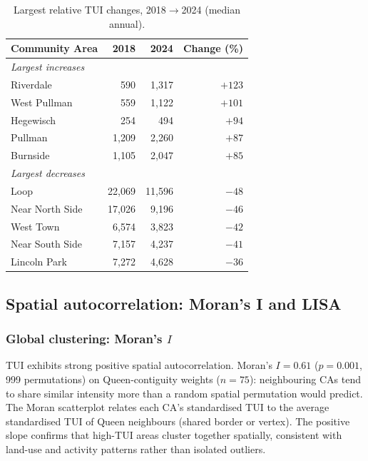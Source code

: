 \documentclass[10pt, a4paper]{article}
\begin{document}
\begin{table}[htbp]
    \centering
    \caption{Largest relative TUI changes, 2018$\to$2024 (median annual).}
    \label{tab:temporal_change}
    \small
    \begin{tabular}{|l|r|r|r|}
        \hline
        \textbf{Community Area} & \textbf{2018} & \textbf{2024} & \textbf{Change (\%)} \\
        \hline
        \multicolumn{4}{|l|}{\textit{Largest increases}} \\
        \hline
        Riverdale & 590 & 1{,}317 & $+123$ \\
        West Pullman & 559 & 1{,}122 & $+101$ \\
        Hegewisch & 254 & 494 & $+94$ \\
        Pullman & 1{,}209 & 2{,}260 & $+87$ \\
        Burnside & 1{,}105 & 2{,}047 & $+85$ \\
        \hline
        \multicolumn{4}{|l|}{\textit{Largest decreases}} \\
        \hline
        Loop & 22{,}069 & 11{,}596 & $-48$ \\
        Near North Side & 17{,}026 & 9{,}196 & $-46$ \\
        West Town & 6{,}574 & 3{,}823 & $-42$ \\
        Near South Side & 7{,}157 & 4{,}237 & $-41$ \\
        Lincoln Park & 7{,}272 & 4{,}628 & $-36$ \\
        \hline
    \end{tabular}
\end{table}

\subsection{Spatial autocorrelation: Moran's I and LISA}
\subsubsection{Global clustering: Moran's $I$}
TUI exhibits strong positive spatial autocorrelation. Moran's $I=0.61$ ($p=0.001$, 999 permutations) on Queen-contiguity weights ($n=75$): neighbouring CAs tend to share similar intensity more than a random spatial permutation would predict. The Moran scatterplot relates each CA's standardised TUI to the average standardised TUI of Queen neighbours (shared border or vertex). The positive slope confirms that high-TUI areas cluster together spatially, consistent with land-use and activity patterns rather than isolated outliers.
\end{document}
